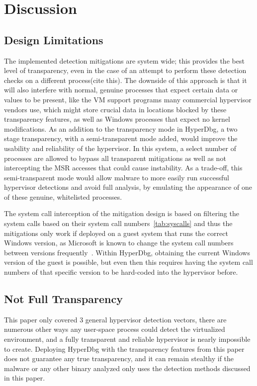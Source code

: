 \section{Discussion}\label{s:discussion}


\subsection{Design Limitations}
The implemented detection mitigations are system wide; this provides the best level of transparency, even in the case of an attempt 
to perform these detection checks on a different process(cite this). The downside of this approach is that it will also interfere with normal, 
genuine processes that expect certain data or values to be present, like the VM support programs many commercial hypervisor vendors use, 
which might store crucial data in locations blocked by these transparency features, as well as Windows processes that expect no kernel modifications. 
As an addition to the transparency mode in HyperDbg, a two stage transparency, with a semi-transparent mode added, would improve the usability and reliability of the hypervisor. 
In this system, a select number of processes are allowed to bypass all transparent mitigations as well as not intercepting the MSR accesses that could cause instability. 
As a trade-off, this semi-transparent mode would allow malware to more easily run successful hypervisor detections and avoid full analysis, by emulating the appearance of one 
of these genuine, whitelisted processes.

The system call interception of the mitigation design is based on filtering the system calls based on their system call numbers~\ref{tab:syscalls} and thus the mitigations 
only work if deployed on a guest system that runs the correct Windows version, as Microsoft is known to change the system call numbers between versions 
frequently~\cite{j00ruSyscalls}. Within HyperDbg, obtaining the current Windows version of the guest is possible, but even then this requires having the 
system call numbers of that specific version to be hard-coded into the hypervisor before.

\subsection{Not Full Transparency}
This paper only covered 3 general hypervisor detection vectors, there are numerous other ways any user-space process could detect the virtualized environment, 
and a fully transparent and reliable hypervisor is nearly impossible to create. Deploying HyperDbg with the transparency features from this paper does not guarantee any true 
transparency, and it can remain stealthy if the malware or any other binary analyzed only uses the detection methods discussed in this paper.

